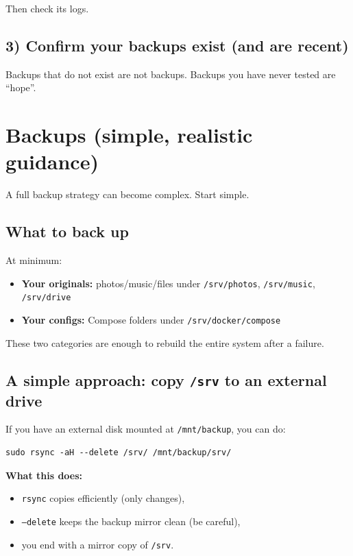 Then check its logs.

\subsection{3) Confirm your backups exist (and are recent)}
Backups that do not exist are not backups.
Backups you have never tested are ``hope''.


\section{Backups (simple, realistic guidance)}
A full backup strategy can become complex. Start simple.

\subsection{What to back up}
At minimum:
\begin{itemize}[leftmargin=*]
  \item \textbf{Your originals:} photos/music/files under \texttt{/srv/photos}, \texttt{/srv/music}, \texttt{/srv/drive}
  \item \textbf{Your configs:} Compose folders under \texttt{/srv/docker/compose}
\end{itemize}

These two categories are enough to rebuild the entire system after a failure.

\subsection{A simple approach: copy \texttt{/srv} to an external drive}
If you have an external disk mounted at \texttt{/mnt/backup}, you can do:

\begin{lstlisting}
sudo rsync -aH --delete /srv/ /mnt/backup/srv/
\end{lstlisting}

\textbf{What this does:}
\begin{itemize}[leftmargin=*]
  \item \texttt{rsync} copies efficiently (only changes),
  \item \texttt{--delete} keeps the backup mirror clean (be careful),
  \item you end with a mirror copy of \texttt{/srv}.
\end{itemize}

